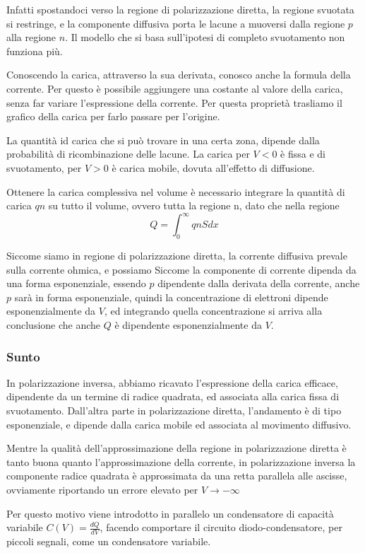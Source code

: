 \documentclass[../template]{subfiles}
\begin{document}
Infatti spostandoci verso la regione di polarizzazione diretta, la regione svuotata si restringe, e la componente diffusiva porta le lacune a muoversi dalla regione $p$ alla regione $n$. Il modello che si basa sull'ipotesi di completo svuotamento non funziona più.

Conoscendo la carica, attraverso la sua derivata, conosco anche la formula della corrente.
Per questo è possibile aggiungere una costante al valore della carica, senza far variare l'espressione della corrente.
Per questa proprietà trasliamo il grafico della carica per farlo passare per l'origine.

La quantità id carica che si può trovare in una certa zona, dipende dalla probabilità di ricombinazione delle lacune.
La carica per $V < 0$ è fissa e di svuotamento, per $V > 0$ è carica mobile, dovuta all'effetto di diffusione.

Ottenere la carica complessiva nel volume è necessario integrare la quantità di carica $qn$ su tutto il volume, ovvero tutta la regione n, dato che nella regione
\[
    Q = \int_0^\infty{qnS dx}
\]

Siccome siamo in regione di polarizzazione diretta, la corrente diffusiva prevale sulla corrente ohmica, e possiamo
Siccome la componente di corrente dipenda da una forma esponenziale, essendo $p$ dipendente dalla derivata della corrente, anche $p$ sarà in forma esponenziale, quindi la concentrazione di elettroni dipende esponenzialmente da $V$, ed integrando quella concentrazione si arriva alla conclusione che anche $Q$ è dipendente esponenzialmente da $V$.

\subsubsection{Sunto}
In polarizzazione inversa, abbiamo ricavato l'espressione della carica efficace, dipendente da un termine di radice quadrata, ed associata alla carica fissa di svuotamento. Dall'altra parte in polarizzazione diretta, l'andamento è di tipo esponenziale, e dipende dalla carica mobile ed associata al movimento diffusivo.

Mentre la qualità dell'approssimazione della regione in polarizzazione diretta è tanto buona quanto l'approssimazione della corrente, in polarizzazione inversa la componente radice quadrata è approssimata da una retta parallela alle ascisse, ovviamente riportando un errore elevato per $V \to -\infty$

Per questo motivo viene introdotto in parallelo un condensatore di capacità variabile $C(V) = \frac{dQ}{dV}$, facendo comportare il circuito diodo-condensatore, per piccoli segnali, come un condensatore variabile.
\end{document}
